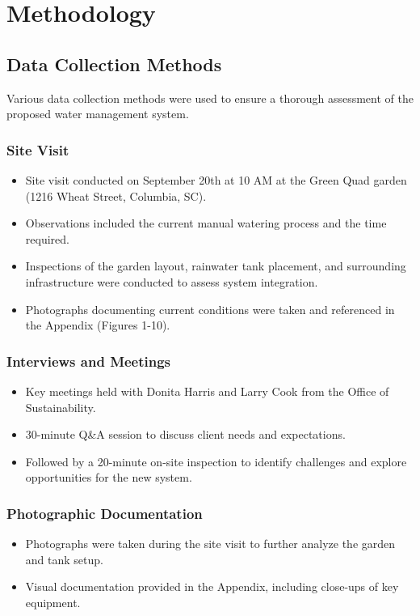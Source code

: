 \documentclass[12pt]{report}
\begin{document}

\section{Methodology}

\subsection{Data Collection Methods}
Various data collection methods were used to ensure a thorough assessment of the proposed water management system.

\subsubsection{Site Visit}
\begin{itemize}
    \item Site visit conducted on September 20th at 10 AM at the Green Quad garden (1216 Wheat Street, Columbia, SC).
    \item Observations included the current manual watering process and the time required.
    \item Inspections of the garden layout, rainwater tank placement, and surrounding infrastructure were conducted to assess system integration.
    \item Photographs documenting current conditions were taken and referenced in the Appendix (Figures 1-10).
\end{itemize}

\subsubsection{Interviews and Meetings}
\begin{itemize}
    \item Key meetings held with Donita Harris and Larry Cook from the Office of Sustainability.
    \item 30-minute Q\&A session to discuss client needs and expectations.
    \item Followed by a 20-minute on-site inspection to identify challenges and explore opportunities for the new system.
\end{itemize}

\subsubsection{Photographic Documentation}
\begin{itemize}
    \item Photographs were taken during the site visit to further analyze the garden and tank setup.
    \item Visual documentation provided in the Appendix, including close-ups of key equipment.
\end{itemize}
\end{document}
